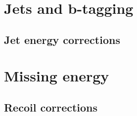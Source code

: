 
\section{Jets and b-tagging}
\label{sec:objects_jets}

\subsection{Jet energy corrections}
\label{sec:objects_jets_jec}

\section{Missing energy}
\label{sec:objects_met}

\subsection{Recoil corrections}
\label{sec:objects_met_recoilcorr}

